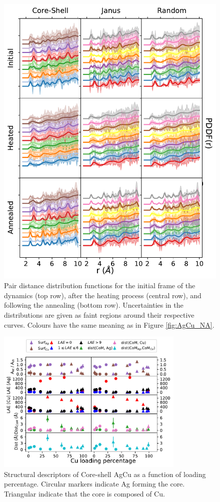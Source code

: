 \begin{figure}
    \centering
    \includegraphics{figures/MD/Alloys/Melt_Ag-Cu.pdf}
    \caption{Pair distance distribution functions for the initial frame of the dynamics (top row), after the heating process (central row), and following the annealing (bottom row). Uncertainties in the distributions are given as faint regions around their respective curves. Colours have the same meaning as in Figure \ref{fig:AgCu_NA}. }
    \label{fig:AgCu_PDF}
\end{figure}


\begin{figure}
    \centering
    \includegraphics[width=0.8\textwidth]{figures/MD/Alloys/Core-Shell_Ag-Cu.pdf}
    \caption{Structural descriptors of Core-shell AgCu as a function of loading percentage. Circular markers indicate Ag forming the core. Triangular indicate that the core is composed of Cu.}
    \label{fig:AgCuCS_Dyn}
\end{figure}


